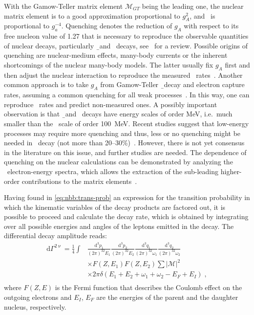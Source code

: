 With the Gamow-Teller matrix element $\mathcal{M}_{GT}$ being the leading one, the nuclear
matrix element is to a good approximation proportional to $g_A^2$, and \thalftwo\ is
proportional to $g_a^{-4}$. Quenching denotes the reduction of $g_A$ with respect to its
free nucleon value of 1.27 that is necessary to reproduce the observable quantities of
nuclear decays, particularly \b\ and \nnbb\ decays, see~\cite{Suhonen2017} for a review.
Possible origins of quenching are nuclear-medium effects, many-body currents or the
inherent shortcomings of the nuclear many-body models. The latter usually fix $g_A$ first
and then adjust the nuclear interaction to reproduce the measured \nnbb\ rates~\cite{?}.
Another common approach is to take $g_A$ from Gamow-Teller \b\ decay and electron capture
rates, assuming a common quenching for all weak processes~\cite{?}. In this way, one can
reproduce \nnbb\ rates and predict non-measured ones. A possibly important observation is
that \b\ and \nnbb\ decays have energy scales of order MeV, i.e.~much smaller than the
\onbb\ scale of order 100~MeV. Recent studies suggest that low-energy processes may
require more quenching and thus, less or no quenching might be needed in \onbb\ decay (not
more than 20--30\%)~\cite{?}.  However, there is not yet consensus in the literature on
this issue, and further studies are needed. The dependence of quenching on the nuclear
calculations can be demonstrated by analyzing the \nnbb\ electron-energy spectra, which
allows the extraction of the sub-leading higher-order contributions to the matrix
elements~\cite{Gando2019}.

Having found in \cref{eq:nbb:trans-prob} an expression for the transition probability in
which the kinematic variables of the decay products are factored out, it is possible to
proceed and calculate the decay rate, which is obtained by integrating over all possible
energies and angles of the leptons emitted in the decay.  The differential decay amplitude
reads:
\[
  \begin{split}
    \text{d}\Gamma^{2\upnu} =
      \frac{1}{4} \int & \frac{\text{d}^3p_1}{(2\pi)^32E_1}
                         \frac{\text{d}^3p_2}{(2\pi)^32E_2}
                         \frac{\text{d}^3q_1}{(2\pi)^32\omega_1}
                         \frac{\text{d}^3q_2}{(2\pi)^32\omega_2} \\
                       & \times F(Z,E_1) F(Z,E_2) \sum |\mathcal{M}|^2 \\
                       & \times 2\pi\delta (E_1 + E_2 + \omega_1 +
                         \omega_2 - E_F + E_I) \;, \\
  \end{split}
\]
where $F(Z,E)$ is the Fermi function that describes the Coulomb effect on the outgoing
electrons and $E_I$, $E_F$ are the energies of the parent and the daughter nucleus,
respectively.

